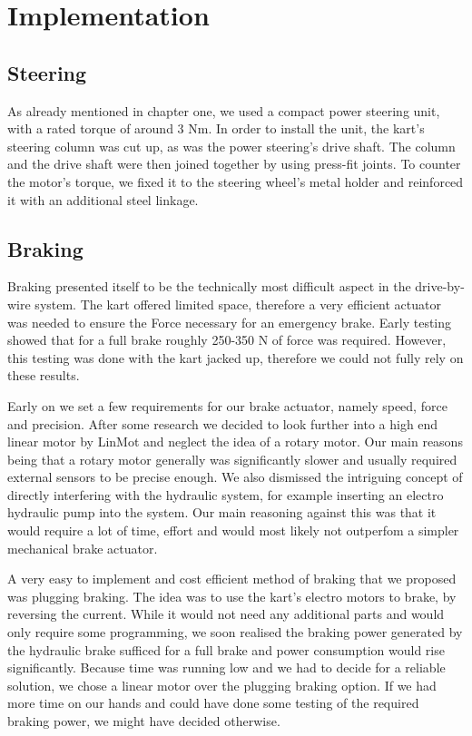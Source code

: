 
\chapter{Implementation}
\label{chp:Implementation}

\section{Steering}

As already mentioned in chapter one, we used a compact power steering unit, with a rated torque of around 3 Nm. In order to install the unit, the kart's steering column was cut up, as was the power steering's drive shaft. The column and the drive shaft were then joined together by using press-fit joints. To counter the motor's torque, we fixed it to the steering wheel's metal holder and reinforced it with an additional steel linkage.

\section{Braking}

Braking presented itself to be the technically most difficult aspect in the drive-by-wire system. The kart offered limited space, therefore a very efficient actuator was needed to ensure the Force necessary for an emergency brake. Early testing showed that for a full brake roughly 250-350 N of force was required. However, this testing was done with the kart jacked up, therefore we could not fully rely on these results.

Early on we set a few requirements for our brake actuator, namely speed, force and precision. After some research we decided to look further into a high end linear motor by LinMot and neglect the idea of a rotary motor. Our main reasons being that a rotary motor generally was significantly slower and usually required external sensors to be precise enough. 
We also dismissed the intriguing concept of directly interfering with the hydraulic system, for example inserting an electro hydraulic pump into the system. Our main reasoning against this was that it would require a lot of time, effort and would most likely not outperfom a simpler mechanical brake actuator.

A very easy to implement and cost efficient method of braking that we proposed was plugging braking. The idea was to use the kart's electro motors to brake, by reversing the current. While it would not need any additional parts and would only require some programming, we soon realised the braking power generated by the hydraulic brake sufficed for a full brake and power consumption would rise significantly. Because time was running low and we had to decide for a reliable solution, we chose a linear motor over the plugging braking option. If we had more time on our hands and could have done some testing of the required braking power, we might have decided otherwise.

